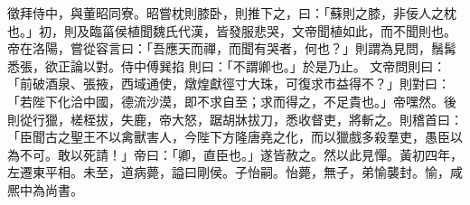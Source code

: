 \begin{pinyinscope}
 
徵拜侍中，與董昭同寮。昭嘗枕則膝卧，則推下之，曰：「蘇則之膝，非佞人之枕也。」初，則及臨菑侯植聞魏氏代漢，皆發服悲哭，文帝聞植如此，而不聞則也。帝在洛陽，嘗從容言曰：「吾應天而禪，而聞有哭者，何也？」則謂為見問，鬚髯悉張，欲正論以對。侍中傅巽掐
 則曰：「不謂卿也。」於是乃止。
 文帝問則曰：「前破酒泉、張掖，西域通使，燉煌獻徑寸大珠，可復求市益得不？」則對曰：「若陛下化洽中國，德流沙漠，即不求自至；求而得之，不足貴也。」帝嘿然。後則從行獵，槎桎拔，失鹿，帝大怒，踞胡牀拔刀，悉收督吏，將斬之。則稽首曰：「臣聞古之聖王不以禽獸害人，今陛下方隆唐堯之化，而以獵戲多殺羣吏，愚臣以為不可。敢以死請！」帝曰：「卿，直臣也。」遂皆赦之。然以此見憚。黃初四年，左遷東平相。未至，道病薨，謚曰剛侯。子怡嗣。怡薨，無子，弟愉襲封。愉，咸熈中為尚書。
 
 
\end{pinyinscope}